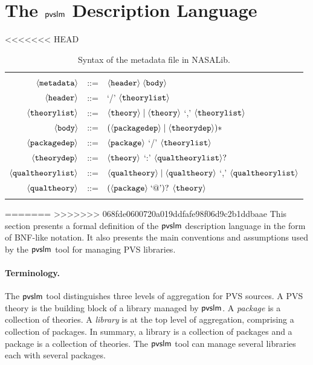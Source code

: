 \section{The $\textsf{pvslm}$ Description Language}
\label{sec.conf}

<<<<<<< HEAD
\begin{table}[pthb]
  \centering
  \begin{tabular}{r c p{8cm}}
    \hline \\
    $\langle{\texttt{metadata}}\rangle$ & ::= & $\langle{\texttt{header}}\rangle \; \langle{\texttt{body}}\rangle$ \\
    $\langle{\texttt{header}}\rangle$ & ::= & `/' $\langle{\texttt{theorylist}}\rangle$ \\
    $\langle{\texttt{theorylist}}\rangle$ & ::= & $\langle{\texttt{theory}}\rangle \mid \langle{\texttt{theory}}\rangle$ `,' $\langle{\texttt{theorylist}}\rangle$ \\
    $\langle{\texttt{body}}\rangle$ & ::= & $(\langle{\texttt{packagedep}}\rangle \mid \langle{\texttt{theorydep}}\rangle)*$ \\
    $\langle{\texttt{packagedep}}\rangle$ & ::= & $\langle{\texttt{package}}\rangle$ `/' $\langle{\texttt{theorylist}}\rangle$ \\
    $\langle{\texttt{theorydep}}\rangle$ & ::= & $\langle{\texttt{theory}}\rangle$ `:' $\langle{\texttt{qualtheorylist}}\rangle ?$ \\
    $\langle{\texttt{qualtheorylist}}\rangle$ & ::= & $\langle{\texttt{qualtheory}}\rangle \mid \langle{\texttt{qualtheory}}\rangle$ `,' $\langle{\texttt{qualtheorylist}}\rangle$ \\
    $\langle{\texttt{qualtheory}}\rangle$ & ::= & $(\langle{\texttt{package}}\rangle\; \text{`@'})?$ $\langle{\texttt{theory}}\rangle$ \\
    \\
    \hline
  \end{tabular}
  \caption{Syntax of the  metadata file in NASALib.}
  \label{tab.bnf}
\end{table}


=======
>>>>>>> 068fde0600720a019ddfafe98f06d9c2b1ddbaae
This section presents a formal definition of the $\textsf{pvslm}$ description
language in the form of BNF-like notation. It also presents the main
conventions and assumptions used by the $\textsf{pvslm}$ tool for managing PVS
libraries.


\paragraph{Terminology.}
The $\textsf{pvslm}$ tool distinguishes three levels of aggregation for PVS
sources. A PVS theory is the building block of a library managed by
$\textsf{pvslm}$. A {\em package} is a collection of theories.  A {\em
  library} is at the top level of aggregation, comprising a collection
of packages. In summary, a library is a collection of packages and a
package is a collection of theories. The $\textsf{pvslm}$ tool can manage
several libraries each with several packages.

